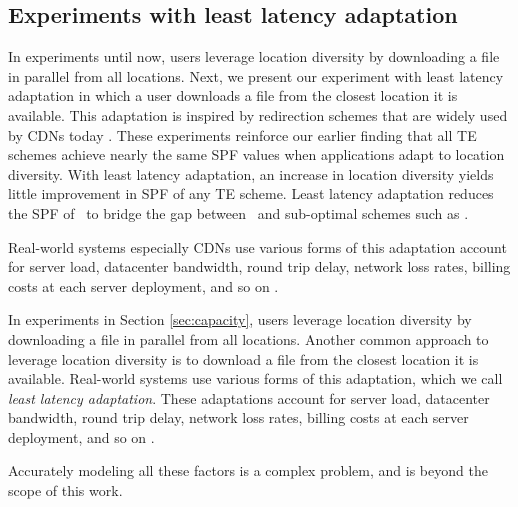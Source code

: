 \subsection{Experiments with least latency adaptation}
\label{sec:leastlatency}


In experiments until now, users leverage location diversity by downloading a file in parallel from all locations. Next, we present our experiment with least latency adaptation in which a user downloads a file from the closest location it is available. 
This adaptation is inspired by redirection schemes that are widely used by CDNs today \cite{Akamai2002,donar}.
These experiments reinforce our earlier finding that all TE schemes achieve nearly the same SPF values when applications adapt to location diversity.
With least latency adaptation, an increase in location diversity yields little improvement in SPF of any TE scheme.
Least latency adaptation reduces the SPF of \opt\ to bridge the gap between \opt\ and sub-optimal schemes such as \optwt.




\eat
{
Real-world systems especially CDNs \cite{Akamai2002,donar} use various forms of this adaptation account for  server load, datacenter bandwidth, round trip delay, network loss rates, billing costs at each server deployment, and so on \cite{Akamai2002,donar}.


In experiments in Section \ref{sec:capacity}, users leverage location diversity by downloading a file in parallel from all locations.
Another common approach to leverage location diversity is to download a file from the closest location it is available.
Real-world systems use various forms of this adaptation, which we call \emph{least latency adaptation}. 
These adaptations account for  server load, datacenter bandwidth, round trip delay, network loss rates, billing costs at each server deployment, and so on \cite{Akamai2002,donar}.


Accurately modeling all these factors is a complex problem, and is beyond the scope of this work.
}



